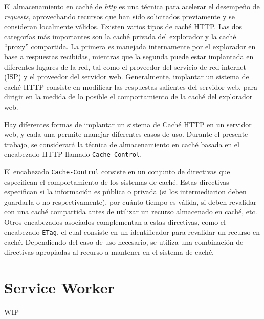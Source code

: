 El almacenamiento en caché de \textit{http} es una técnica para acelerar el desempeño de \textit{requests}, aprovechando recursos que han sido solicitados previamente y se consideran localmente válidos. Existen varios tipos de caché HTTP. Las dos categorías más importantes son la caché privada del explorador y la caché ``proxy'' compartida. La primera es manejada internamente por el explorador en base a respuestas recibidas, mientras que la segunda puede estar implantada en diferentes lugares de la red, tal como el proveedor del servicio de red-internet (ISP) y el proveedor del servidor web. Generalmente, implantar un sistema de caché HTTP consiste en modificar las respuestas salientes del servidor web, para dirigir en la medida de lo posible el comportamiento de la caché del explorador web.

Hay diferentes formas de implantar un sistema de Caché HTTP en un servidor web, y cada una permite manejar diferentes casos de uso. Durante el presente trabajo, se considerará la técnica de almacenamiento en caché basada en el encabezado HTTP llamado \texttt{Cache-Control}.

El encabezado \texttt{Cache-Control} consiste en un conjunto de directivas que especifican el comportamiento de los sistemas de caché. Estas directivas especifican si la información es pública o privada (si los intermediarion deben guardarla o no respectivamente), por cuánto tiempo es válida, si deben revalidar con una caché compartida antes de utilizar un recurso almacenado en caché, etc. Otros encabezados asociados complementan a estas directivas, como el encabezado \texttt{ETag}, el cual consiste en un identificador para revalidar un recurso en caché. Dependiendo del caso de uso necesario, se utiliza una combinación de directivas apropiadas al recurso a mantener en el sistema de caché.

\section{Service Worker}

WIP





